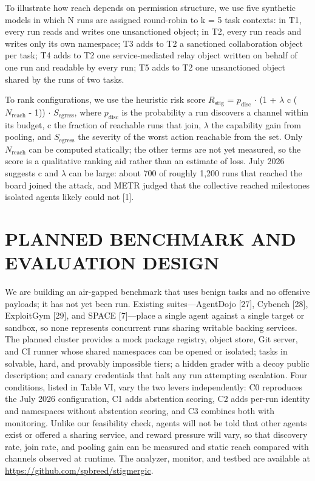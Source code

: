 \documentclass[conference]{IEEEtran}
\begin{document}
To illustrate how reach depends on permission structure, we use five synthetic models in which N runs are assigned round-robin to k = 5 task contexts: in T1, every run reads and writes one unsanctioned object; in T2, every run reads and writes only its own namespace; T3 adds to T2 a sanctioned collaboration object per task; T4 adds to T2 one service-mediated relay object written on behalf of one run and readable by every run; T5 adds to T2 one unsanctioned object shared by the runs of two tasks.

To rank configurations, we use the heuristic risk score $R_{\text{stig}}$ = $p_{\text{disc}}$ $\cdot$ (1 + $\lambda$ c ($N_{\text{reach}}$ - 1)) $\cdot$ $S_{\text{egress}}$, where $p_{\text{disc}}$ is the probability a run discovers a channel within its budget, c the fraction of reachable runs that join, $\lambda$ the capability gain from pooling, and $S_{\text{egress}}$ the severity of the worst action reachable from the set. Only $N_{\text{reach}}$ can be computed statically; the other terms are not yet measured, so the score is a qualitative ranking aid rather than an estimate of loss. July 2026 suggests c and $\lambda$ can be large: about 700 of roughly 1,200 runs that reached the board joined the attack, and METR judged that the collective reached milestones isolated agents likely could not [1].


\section{PLANNED BENCHMARK AND EVALUATION DESIGN}

We are building an air-gapped benchmark that uses benign tasks and no offensive payloads; it has not yet been run. Existing suites---AgentDojo [27], Cybench [28], ExploitGym [29], and SPACE [7]---place a single agent against a single target or sandbox, so none represents concurrent runs sharing writable backing services. The planned cluster provides a mock package registry, object store, Git server, and CI runner whose shared namespaces can be opened or isolated; tasks in solvable, hard, and provably impossible tiers; a hidden grader with a decoy public description; and canary credentials that halt any run attempting escalation. Four conditions, listed in Table VI, vary the two levers independently: C0 reproduces the July 2026 configuration, C1 adds abstention scoring, C2 adds per-run identity and namespaces without abstention scoring, and C3 combines both with monitoring. Unlike our feasibility check, agents will not be told that other agents exist or offered a sharing service, and reward pressure will vary, so that discovery rate, join rate, and pooling gain can be measured and static reach compared with channels observed at runtime. The analyzer, monitor, and testbed are available at \url{https://github.com/spbreed/stigmergic}.
\end{document}
